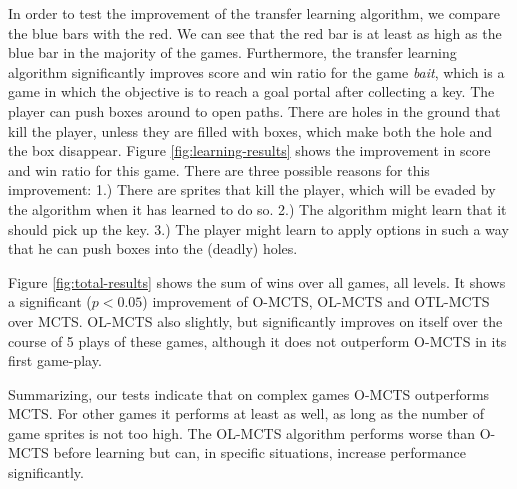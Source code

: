 In order to test the improvement of the transfer learning algorithm, we compare
the blue bars with the red. We can see that the red bar is at least as high as
the blue bar in the majority of the games. Furthermore, the transfer learning
algorithm significantly improves score and win ratio for the game \textit{bait},
which is a game in which the objective is to reach a goal portal after
collecting a key. The player can push boxes around to open paths. There are
holes in the ground that kill the player, unless they are filled with boxes,
which make both the hole and the box disappear. Figure
\ref{fig:learning-results} shows the improvement in score and win ratio for this
game. There are three possible reasons for this improvement: 1.) There are
sprites that kill the player, which will be evaded by the algorithm when it has
learned to do so.  2.) The algorithm might learn that it should pick up the key.
3.) The player might learn to apply options in such a way that he can push boxes
into the (deadly) holes.

Figure \ref{fig:total-results} shows the sum of wins over all games, all levels.
It shows a significant ($p < 0.05$) improvement of O-MCTS, OL-MCTS and OTL-MCTS
over MCTS. OL-MCTS also slightly, but significantly improves on itself over the
course of 5 plays of these games, although it does not outperform O-MCTS in its
first game-play.

Summarizing, our tests indicate that on complex games O-MCTS outperforms MCTS.
For other games it performs at least as well, as long as the number of game
sprites is not too high. The OL-MCTS algorithm performs worse than O-MCTS before
learning but can, in specific situations, increase performance significantly.

